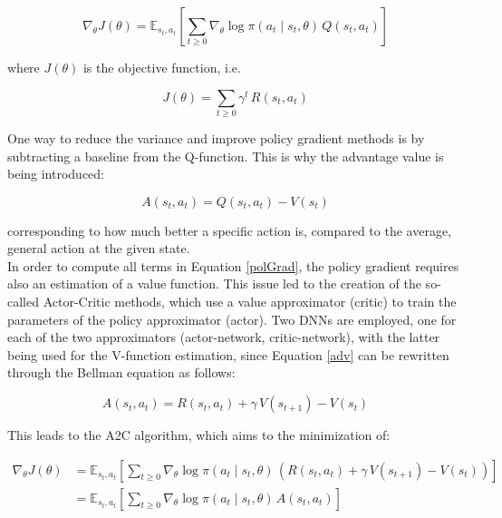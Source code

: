 \begin{equation}
    \nabla _{\theta} J(\theta) = \mathbb{E}_{s_t,a_t}\left[ \sum _{t\geq 0} \nabla _{\theta} \log \pi (a_t \mid s_t, \theta) \, Q(s_t,a_t) \right] \label{polGrad}
\end{equation}

where $J(\theta)$ is the objective function, i.e. 

\begin{equation}
    J(\theta)=\sum _{t\geq 0} \gamma ^t \, R(s_t, a_t)
\end{equation}

One way to reduce the variance and improve policy gradient methods is by subtracting a baseline from the Q-function. This is why the advantage value is being introduced:

\begin{equation}
    A(s_t, a_t) = Q(s_t, a_t) - V(s_t) \label{adv}
\end{equation}

corresponding to how much better a specific action is, compared to the average, general action at the given state.\\

In order to compute all terms in Equation \ref{polGrad}, the policy gradient requires also an estimation of a value function. This issue led to the creation of the so-called Actor-Critic methods, which use a value approximator (critic) to train the parameters of the policy approximator (actor). Two \glspl{DNN} are employed, one for each of the two approximators (actor-network, critic-network), with the latter being used for the V-function estimation, since Equation \ref{adv} can be rewritten through the Bellman equation as follows:

\begin{equation}
    A(s_t, a_t) = R(s_t, a_t) + \gamma \, V(s_{t+1}) - V(s_t)
\end{equation}

\newpage

This leads to the \gls{A2C} algorithm, which aims to the minimization of:

\begin{align}
    \nabla _{\theta} J(\theta) &= \mathbb{E}_{s_t,a_t}\left[ \sum _{t\geq 0} \nabla _{\theta} \log \pi (a_t \mid s_t, \theta) \, \left( R(s_t, a_t) + \gamma \, V(s_{t+1}) - V(s_t) \right) \right] \nonumber \\
    &= \mathbb{E}_{s_t,a_t}\left[ \sum _{t\geq 0} \nabla _{\theta} \log \pi (a_t \mid s_t, \theta) \, A(s_t,a_t) \right]
\end{align}

